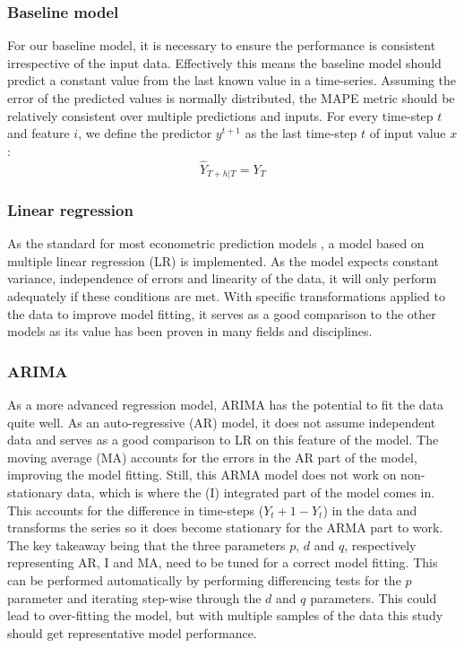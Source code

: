 \subsubsection{Baseline model}
\label{sec:baseline}
For our baseline model, it is necessary to ensure the performance is consistent irrespective of the input data. Effectively this means the baseline model should predict a constant value from the last known value in a time-series. Assuming the error of the predicted values is normally distributed, the MAPE metric should be relatively consistent over multiple predictions and inputs. For every time-step $t$ and feature $i$, we define the predictor $y^{t+1}$ as the last time-step $t$ of input value $x$: $$\hat{Y}_{T+h|T} = Y_T$$

\subsubsection{Linear regression}
\label{sec:lr}
As the standard for most econometric prediction models \cite{greene2003econometric}, a model based on multiple linear regression (LR) is implemented. As the model expects constant variance, independence of errors and linearity of the data, it will only perform adequately if these conditions are met. With specific transformations applied to the data to improve model fitting, it serves as a good comparison to the other models as its value has been proven in many fields and disciplines. 

\subsubsection{ARIMA}
\label{sec:arima}
As a more advanced regression model, ARIMA has the potential to fit the data quite well. As an auto-regressive (AR) model, it does not assume independent data and serves as a good comparison to LR on this feature of the model. The moving average (MA) accounts for the errors in the AR part of the model, improving the model fitting. Still, this ARMA model does not work on non-stationary data, which is where the (I) integrated part of the model comes in. This accounts for the difference in time-steps ($Y_t+1 - Y_t$) in the data and transforms the series so it does become stationary for the ARMA part to work. The key takeaway being that the three parameters $p$, $d$ and $q$, respectively representing AR, I and MA, need to be tuned for a correct model fitting. This can be performed automatically by performing differencing tests for the $p$ parameter and iterating step-wise through the $d$ and $q$ parameters. This could lead to over-fitting the model, but with multiple samples of the data this study should get representative model performance.

